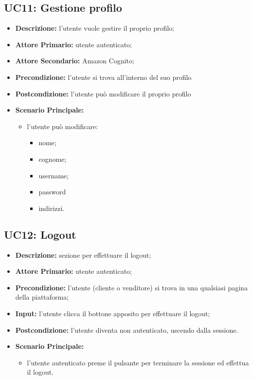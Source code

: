         \subsection{UC11: Gestione profilo}
        \label{sec:UC11}
        \begin{itemize}
            \item \textbf{Descrizione:} l'utente vuole gestire il proprio profilo;
            \item \textbf{Attore Primario:} utente autenticato;
            \item \textbf{Attore Secondario:} Amazon Cognito;
            \item \textbf{Precondizione:} l'utente si trova all'interno del suo profilo
            \item \textbf{Postcondizione:} l'utente può modificare il proprio profilo
            \item \textbf{Scenario Principale:}
            \begin{itemize}
                \item  l'utente può modificare:
                \begin{itemize}
                    \item nome;
                    \item cognome;
                    \item username;
                    \item password
                    \item indirizzi.
                \end{itemize}
            \end{itemize}
        \end{itemize}

        
        \subsection{UC12: Logout}
        \begin{itemize}
            \item \textbf{Descrizione:} sezione per effettuare il logout;
            \item \textbf{Attore Primario:} utente autenticato;
            \item \textbf{Precondizione:} l'utente (cliente o venditore) si trova in una qualsiasi pagina della piattaforma;
            \item \textbf{Input:} l'utente clicca il bottone apposito per effettuare il logout;
            \item \textbf{Postcondizione:} l'utente diventa non autenticato, uscendo dalla sessione.
            \item \textbf{Scenario Principale:}
            \begin{itemize}
                \item l'utente autenticato preme il pulsante per terminare la sessione ed effettua il logout.
            \end{itemize}
        \end{itemize}

